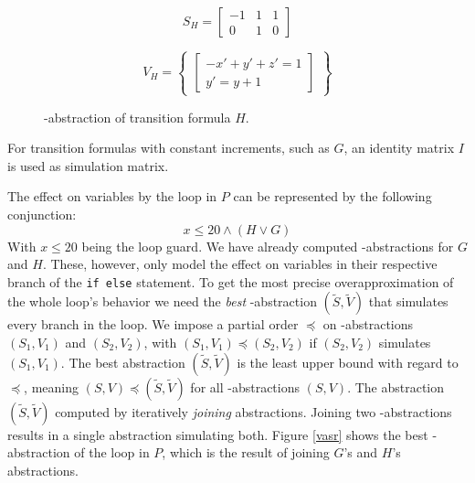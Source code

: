 \begin{figure}[H]
	\begin{center}
		\begin{minipage}{0.3\linewidth}
			\begin{equation*}
				S_H = \begin{bmatrix} -1 & 1 & 1 \\ 0 & 1 & 0 \end{bmatrix}
			\end{equation*}
		\end{minipage}
		\begin{minipage}{0.6\linewidth}
			\begin{equation*}
				V_H = \begin{Bmatrix} \begin{bmatrix} -x' + y' + z' = 1\\ y' = y + 1 \end{bmatrix} \end{Bmatrix}
			\end{equation*}
		\end{minipage}
		\caption{\qvasr-abstraction of transition formula $H$.}
		\label{vasr H}
	\end{center}
\end{figure}
\vspace*{-2em}For transition formulas with constant increments, such as $G$, an identity matrix $I$ is used as simulation matrix. \par
The effect on variables by the loop in $P$ can be represented by the following conjunction: 
\begin{equation*}
	x \leq 20 \land (H \lor G)
\end{equation*}
With $x \leq 20$ being the loop guard. We have already computed \qvasr-abstractions for $G$ and $H$. These, however, only model the effect on variables in their respective branch of the \texttt{if else} statement. To get the most precise overapproximation of the whole loop's behavior we need the \textsl{best} \qvasr-abstraction $(\tilde{S}, \tilde{V})$ that simulates every branch in the loop.
We impose a partial order $\preceq$ on \qvasr-abstractions $(S_1, V_1)$ and $(S_2, V_2)$, with $(S_1, V_1) \preceq (S_2, V_2)$ if $(S_2, V_2)$ simulates $(S_1, V_1)$. The best abstraction $(\tilde{S}, \tilde{V})$ is the least upper bound with regard to $\preceq$, meaning $(S, V) \preceq (\tilde{S}, \tilde{V})$ for all \qvasr-abstractions $(S, V)$. The abstraction $(\tilde{S}, \tilde{V})$ computed by iteratively \textsl{joining} abstractions. Joining two \qvasr-abstractions results in a single abstraction simulating both. Figure \ref{vasr} shows the best \qvasr-abstraction of the loop in $P$, which is the result of joining $G$'s and $H$'s abstractions. \\
